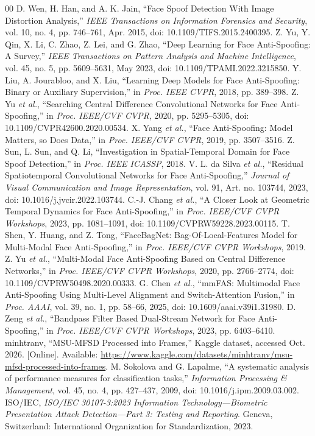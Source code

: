 \documentclass[a4paper,conference]{IEEEtran}
\begin{document}
\FloatBarrier
\begin{thebibliography}{00}
 D. Wen, H. Han, and A. K. Jain, ``Face Spoof Detection With Image Distortion Analysis,'' \emph{IEEE Transactions on Information Forensics and Security}, vol. 10, no. 4, pp. 746--761, Apr. 2015, doi: 10.1109/TIFS.2015.2400395.
 Z. Yu, Y. Qin, X. Li, C. Zhao, Z. Lei, and G. Zhao, ``Deep Learning for Face Anti-Spoofing: A Survey,'' \emph{IEEE Transactions on Pattern Analysis and Machine Intelligence}, vol. 45, no. 5, pp. 5609--5631, May 2023, doi: 10.1109/TPAMI.2022.3215850.
 Y. Liu, A. Jourabloo, and X. Liu, ``Learning Deep Models for Face Anti-Spoofing: Binary or Auxiliary Supervision,'' in \emph{Proc. IEEE CVPR}, 2018, pp. 389--398.
 Z. Yu \emph{et al.}, ``Searching Central Difference Convolutional Networks for Face Anti-Spoofing,'' in \emph{Proc. IEEE/CVF CVPR}, 2020, pp. 5295--5305, doi: 10.1109/CVPR42600.2020.00534.
 X. Yang \emph{et al.}, ``Face Anti-Spoofing: Model Matters, so Does Data,'' in \emph{Proc. IEEE/CVF CVPR}, 2019, pp. 3507--3516.
 Z. Sun, L. Sun, and Q. Li, ``Investigation in Spatial-Temporal Domain for Face Spoof Detection,'' in \emph{Proc. IEEE ICASSP}, 2018.
 V. L. da Silva \emph{et al.}, ``Residual Spatiotemporal Convolutional Networks for Face Anti-Spoofing,'' \emph{Journal of Visual Communication and Image Representation}, vol. 91, Art. no. 103744, 2023, doi: 10.1016/j.jvcir.2022.103744.
 C.-J. Chang \emph{et al.}, ``A Closer Look at Geometric Temporal Dynamics for Face Anti-Spoofing,'' in \emph{Proc. IEEE/CVF CVPR Workshops}, 2023, pp. 1081--1091, doi: 10.1109/CVPRW59228.2023.00115.
 T. Shen, Y. Huang, and Z. Tong, ``FaceBagNet: Bag-Of-Local-Features Model for Multi-Modal Face Anti-Spoofing,'' in \emph{Proc. IEEE/CVF CVPR Workshops}, 2019.
 Z. Yu \emph{et al.}, ``Multi-Modal Face Anti-Spoofing Based on Central Difference Networks,'' in \emph{Proc. IEEE/CVF CVPR Workshops}, 2020, pp. 2766--2774, doi: 10.1109/CVPRW50498.2020.00333.
 G. Chen \emph{et al.}, ``mmFAS: Multimodal Face Anti-Spoofing Using Multi-Level Alignment and Switch-Attention Fusion,'' in \emph{Proc. AAAI}, vol. 39, no. 1, pp. 58--66, 2025, doi: 10.1609/aaai.v39i1.31980.
 D. Zeng \emph{et al.}, ``Bandpass Filter Based Dual-Stream Network for Face Anti-Spoofing,'' in \emph{Proc. IEEE/CVF CVPR Workshops}, 2023, pp. 6403--6410.
 minhtranv, ``MSU-MFSD Processed into Frames,'' Kaggle dataset, accessed Oct. 2026. [Online]. Available: \url{https://www.kaggle.com/datasets/minhtranv/msu-mfsd-processed-into-frames}.
 M. Sokolova and G. Lapalme, ``A systematic analysis of performance measures for classification tasks,'' \emph{Information Processing \& Management}, vol. 45, no. 4, pp. 427--437, 2009, doi: 10.1016/j.ipm.2009.03.002.
 ISO/IEC, \emph{ISO/IEC 30107-3:2023 Information Technology---Biometric Presentation Attack Detection---Part 3: Testing and Reporting}. Geneva, Switzerland: International Organization for Standardization, 2023.
\end{thebibliography}
\end{document}
